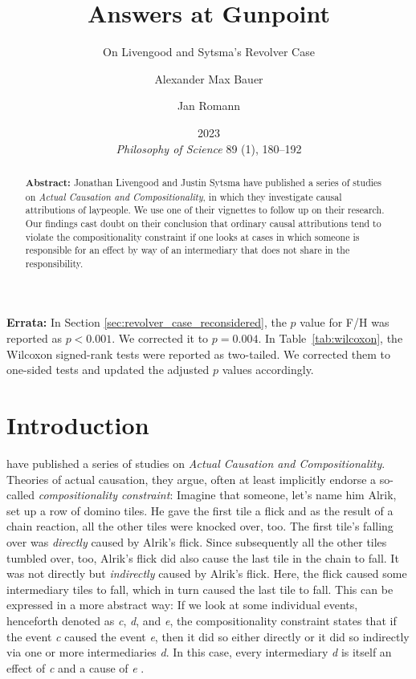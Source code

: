 \documentclass[12pt]{scrartcl}
\title{Answers at Gunpoint}
\subtitle{On Livengood and Sytsma's Revolver Case}
\author[1]{Alexander Max Bauer}
\author[2]{Jan Romann}
\affil[1]{ Department of Philosophy, University of Oldenburg,

Corresponding Author, E-Mail: \href{mailto:alexander.max.bauer@uni-oldenburg.de}{alexander.max.bauer@uni-oldenburg.de}}
\affil[2]{ SOCIUM Research Center on Inequality and Social Policy, University of Bremen}
\date{\small 2023\\\textit{Philosophy of Science} 89 (1), 180--192}
\begin{document}
\maketitle

\noindent\textbf{\textsf{Errata:}} In Section \ref{sec:revolver_case_reconsidered}, the $p$ value for F/H was reported as $p < 0.001$.
We corrected it to $p = 0.004$. In Table~\ref{tab:wilcoxon}, the Wilcoxon signed-rank tests were reported as two-tailed. We corrected them to one-sided tests and updated the adjusted $p$ values accordingly.

\begin{abstract}
   \noindent\textbf{\textsf{Abstract:}} Jonathan Livengood and Justin Sytsma have published a series of studies on \textit{Actual Causation and Compositionality}, in which they investigate causal attributions of laypeople. We use one of their vignettes to follow up on their research. Our findings cast doubt on their conclusion that ordinary causal attributions tend to violate the compositionality constraint if one looks at cases in which someone is responsible for an effect by way of an intermediary that does not share in the responsibility.
\end{abstract}

\section{Introduction}
\citet*{livengood_actual_2020} have published a series of studies on \textit{Actual Causation and Compositionality}. Theories of actual causation, they argue, often at least implicitly endorse a so-called \textit{compositionality constraint}: Imagine that someone, let's name him Alrik, set up a row of domino tiles. He gave the first tile a flick and as the result of a chain reaction, all the other tiles were knocked over, too. The first tile's falling over was \textit{directly} caused by Alrik's flick. Since subsequently all the other tiles tumbled over, too, Alrik's flick did also cause the last tile in the chain to fall. It was not directly but \textit{indirectly} caused by Alrik's flick. Here, the flick caused some intermediary tiles to fall, which in turn caused the last tile to fall. This can be expressed in a more abstract way: If we look at some individual events, henceforth denoted as \textit{c}, \textit{d}, and \textit{e}, the compositionality constraint states that if the event \textit{c} caused the event \textit{e}, then it did so either directly or it did so indirectly via one or more intermediaries \textit{d}. In this case, every intermediary \textit{d} is itself an effect of \textit{c} and a cause of \textit{e} \citep[44]{livengood_actual_2020}.
\end{document}
